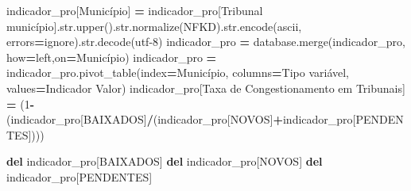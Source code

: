 \documentclass[
  12,
  dvipsnames]{article}
\newenvironment{Shaded}{\begin{snugshade}}{\end{snugshade}}
\newcommand{\BuiltInTok}[1]{#1}
\newcommand{\DecValTok}[1]{\textcolor[rgb]{0.00,0.00,0.81}{#1}}
\newcommand{\KeywordTok}[1]{\textcolor[rgb]{0.13,0.29,0.53}{\textbf{#1}}}
\newcommand{\NormalTok}[1]{#1}
\newcommand{\OperatorTok}[1]{\textcolor[rgb]{0.81,0.36,0.00}{\textbf{#1}}}
\newcommand{\StringTok}[1]{\textcolor[rgb]{0.31,0.60,0.02}{#1}}
\begin{document}
\begin{Shaded}
\begin{Highlighting}[]
\NormalTok{indicador\_pro[}\StringTok{\textquotesingle{}Município\textquotesingle{}}\NormalTok{] }\OperatorTok{=}\NormalTok{ indicador\_pro[}\StringTok{\textquotesingle{}Tribunal município\textquotesingle{}}\NormalTok{].}\BuiltInTok{str}\NormalTok{.upper().}\BuiltInTok{str}\NormalTok{.normalize(}\StringTok{\textquotesingle{}NFKD\textquotesingle{}}\NormalTok{).}\BuiltInTok{str}\NormalTok{.encode(}\StringTok{\textquotesingle{}ascii\textquotesingle{}}\NormalTok{, errors}\OperatorTok{=}\StringTok{\textquotesingle{}ignore\textquotesingle{}}\NormalTok{).}\BuiltInTok{str}\NormalTok{.decode(}\StringTok{\textquotesingle{}utf{-}8\textquotesingle{}}\NormalTok{)}
\NormalTok{indicador\_pro }\OperatorTok{=}\NormalTok{ database.merge(indicador\_pro, how}\OperatorTok{=}\StringTok{\textquotesingle{}left\textquotesingle{}}\NormalTok{,on}\OperatorTok{=}\StringTok{\textquotesingle{}Município\textquotesingle{}}\NormalTok{)}
\NormalTok{indicador\_pro }\OperatorTok{=}\NormalTok{ indicador\_pro.pivot\_table(index}\OperatorTok{=}\StringTok{\textquotesingle{}Município\textquotesingle{}}\NormalTok{, columns}\OperatorTok{=}\StringTok{\textquotesingle{}Tipo variável\textquotesingle{}}\NormalTok{, values}\OperatorTok{=}\StringTok{\textquotesingle{}Indicador Valor\textquotesingle{}}\NormalTok{)}
\NormalTok{indicador\_pro[}\StringTok{\textquotesingle{}Taxa de Congestionamento em Tribunais\textquotesingle{}}\NormalTok{] }\OperatorTok{=}\NormalTok{ (}\DecValTok{1}\OperatorTok{{-}}\NormalTok{(indicador\_pro[}\StringTok{\textquotesingle{}BAIXADOS\textquotesingle{}}\NormalTok{]}\OperatorTok{/}\NormalTok{(indicador\_pro[}\StringTok{\textquotesingle{}NOVOS\textquotesingle{}}\NormalTok{]}\OperatorTok{+}\NormalTok{indicador\_pro[}\StringTok{\textquotesingle{}PENDENTES\textquotesingle{}}\NormalTok{])))}

\KeywordTok{del}\NormalTok{ indicador\_pro[}\StringTok{\textquotesingle{}BAIXADOS\textquotesingle{}}\NormalTok{]}
\KeywordTok{del}\NormalTok{ indicador\_pro[}\StringTok{\textquotesingle{}NOVOS\textquotesingle{}}\NormalTok{]}
\KeywordTok{del}\NormalTok{ indicador\_pro[}\StringTok{\textquotesingle{}PENDENTES\textquotesingle{}}\NormalTok{]}


\end{Highlighting}
\end{Shaded}
\end{document}
